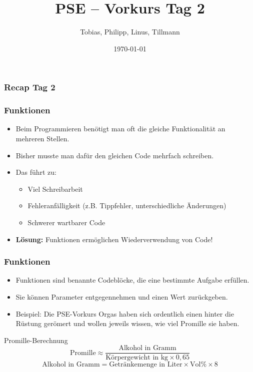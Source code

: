 \documentclass{../../presentation}
\title{PSE – Vorkurs Tag 2}
\author{Tobias, Philipp, Linus, Tillmann}
\institute{FIUS - Fachgruppe Informatik Universität Stuttgart}
\date{\today}
\begin{document}
\begin{frame}
    \titlepage
\end{frame}

\begin{frame}
    \listoftodos
\end{frame}

\begin{frame}
    \frametitle{Recap Tag 2}
\end{frame}

\begin{frame}[fragile]
    \frametitle{Funktionen}
    \begin{itemize}
        \item Beim Programmieren benötigt man oft die gleiche Funktionalität an mehreren Stellen.
        \item Bisher musste man dafür den gleichen Code mehrfach schreiben.
        \item Das führt zu:
              \begin{itemize}
                  \item Viel Schreibarbeit
                  \item Fehleranfälligkeit (z.B. Tippfehler, unterschiedliche Änderungen)
                  \item Schwerer wartbarer Code
              \end{itemize}
        \item \textbf{Lösung:} Funktionen ermöglichen Wiederverwendung von Code!
    \end{itemize}
\end{frame}

\begin{frame}
    \frametitle{Funktionen}
    \begin{itemize}
        \item Funktionen sind benannte Codeblöcke, die eine bestimmte Aufgabe erfüllen.
        \item Sie können Parameter entgegennehmen und einen Wert zurückgeben.
        \item Beispiel: Die PSE-Vorkurs Orgas haben sich ordentlich einen hinter die Rüstung gerömert und wollen jeweils wissen, wie viel Promille sie haben.
    \end{itemize}
    \begin{block}{Promille-Berechnung}
        \[
            \text{Promille} \approx \frac{\text{Alkohol in Gramm}}{\text{Körpergewicht in kg} \times 0{,}65}
        \]
        \[
            \text{Alkohol in Gramm} = \text{Getränkemenge in Liter} \times \text{Vol\%} \times 8
        \]
    \end{block}
\end{frame}
\end{document}
